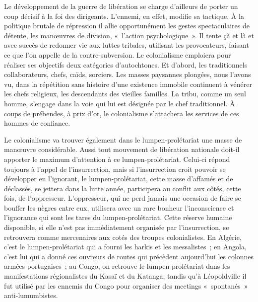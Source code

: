 \documentclass[french,twoside]{book} %
\begin{document}
Le développement de la guerre de libération se charge d’ailleurs de porter un coup décisif à la foi des dirigeants. L’ennemi, en effet, modifie sa tactique. À la politique brutale de répression il allie opportunément les gestes spectaculaires de détente, les manœuvres de division, « l’action psychologique ». Il tente çà et là et avec succès de redonner vie aux luttes tribales, utilisant les provocateurs, faisant ce que l’on appelle de la contre-subversion. Le colonialisme emploiera pour réaliser ses objectifs deux catégories d’autochtones. Et d’abord, les traditionnels collaborateurs, chefs, caïds, sorciers. Les masses paysannes plongées, nous l’avons vu, dans la répétition sans histoire d’une existence immobile continuent à vénérer les chefs religieux, les descendants des vieilles familles. La tribu, comme un seul homme, s’engage dans la voie qui lui est désignée par le chef traditionnel. À coups de prébendes, à prix d’or, le colonialisme s’attachera les services de ces hommes de confiance.\par
\bigbreak
\noindent Le colonialisme va trouver également dans le lumpen-prolétariat une masse de manœuvre considérable. Aussi tout mouvement de libération nationale doit-il apporter le maximum   d’attention à ce lumpen-prolétariat. Celui-ci répond toujours à l’appel de l’insurrection, mais si l’insurrection croit pouvoir se développer en l’ignorant, le lumpen-prolétariat, cette masse d’affamés et de déclassés, se jettera dans la lutte année, participera au conflit aux côtés, cette fois, de l’oppresseur. L’oppresseur, qui ne perd jamais une occasion de faire se bouffer les nègres entre eux, utilisera avec un rare bonheur l’inconscience et l’ignorance qui sont les tares du lumpen-prolétariat. Cette réserve humaine disponible, si elle n’est pas immédiatement organisée par l’insurrection, se retrouvera comme mercenaires aux cotés des troupes colonialistes. En Algérie, c’est le lumpen-prolétariat qui a fourni les harkis et les messalistes ; en Angola, c’est lui qui a donné ces ouvreurs de routes qui précèdent aujourd’hui les colonnes armées portugaises ; au Congo, on retrouve le lumpen-prolétariat dans les manifestations régionalistes du Kasaï et du Katanga, tandis qu’à Léopoldville il fut utilisé par les ennemis du Congo pour organiser des meetings « spontanés » anti-lumumbistes.\par
\end{document}
